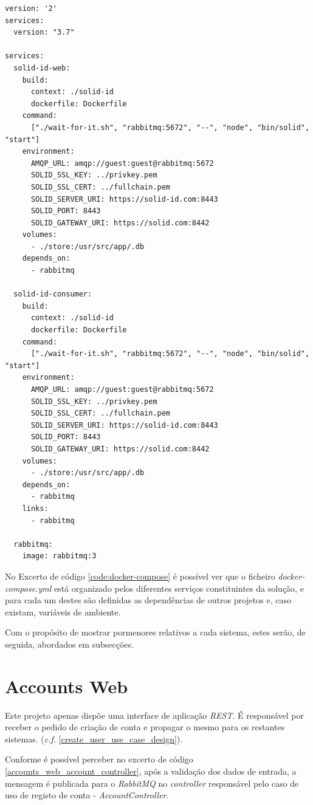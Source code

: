 \begin{lstlisting}[language=docker-compose-2,caption={Ficheiro \emph{docker-compose.yml}},breaklines=true,label={code:docker-compose}]
version: '2'
services:
  version: "3.7"

services:
  solid-id-web:
    build:
      context: ./solid-id
      dockerfile: Dockerfile
    command:
      ["./wait-for-it.sh", "rabbitmq:5672", "--", "node", "bin/solid", "start"]
    environment:
      AMQP_URL: amqp://guest:guest@rabbitmq:5672
      SOLID_SSL_KEY: ../privkey.pem
      SOLID_SSL_CERT: ../fullchain.pem
      SOLID_SERVER_URI: https://solid-id.com:8443
      SOLID_PORT: 8443
      SOLID_GATEWAY_URI: https://solid.com:8442
    volumes:
      - ./store:/usr/src/app/.db
    depends_on:
      - rabbitmq

  solid-id-consumer:
    build:
      context: ./solid-id
      dockerfile: Dockerfile
    command:
      ["./wait-for-it.sh", "rabbitmq:5672", "--", "node", "bin/solid", "start"]
    environment:
      AMQP_URL: amqp://guest:guest@rabbitmq:5672
      SOLID_SSL_KEY: ../privkey.pem
      SOLID_SSL_CERT: ../fullchain.pem
      SOLID_SERVER_URI: https://solid-id.com:8443
      SOLID_PORT: 8443
      SOLID_GATEWAY_URI: https://solid.com:8442
    volumes:
      - ./store:/usr/src/app/.db
    depends_on:
      - rabbitmq
    links:
      - rabbitmq

  rabbitmq:
    image: rabbitmq:3

\end{lstlisting}

No Excerto de código \ref{code:docker-compose} é possível ver que o ficheiro \emph{docker-compose.yml} está organizado pelos diferentes serviços constituintes da solução, e para cada um destes são definidas as dependências de outros projetos e, caso existam, variáveis de ambiente.

Com o propósito de mostrar pormenores relativos a cada sistema, estes serão, de seguida, abordados em subsecções.

\section{Accounts Web}
Este projeto apenas dispõe uma interface de aplicação \emph{\acrshort{REST}}. É responsável por receber o pedido de criação de conta e propagar o mesmo para os restantes sistemas. (\emph{c.f.} \ref{create_user_use_case_design}).

Conforme é possível perceber no excerto de código \ref{accounts_web_account_controller}, após a validação dos dados de entrada, a mensagem é publicada para o \emph{RabbitMQ} no \emph{controller} responsável pelo caso de uso de registo de conta - \emph{AccountController}.

